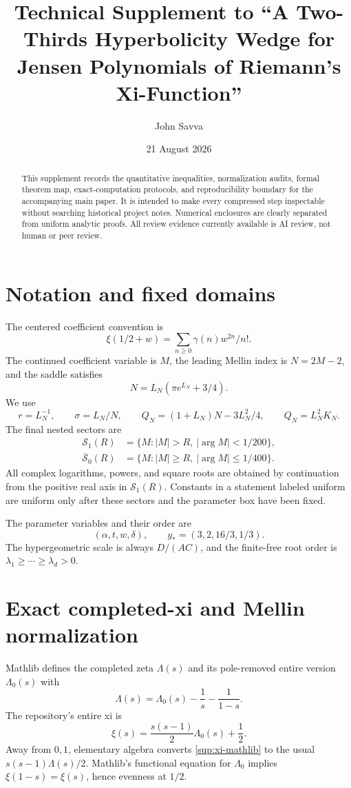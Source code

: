\documentclass[10pt]{article}
\title{Technical Supplement to ``A Two-Thirds Hyperbolicity Wedge for Jensen Polynomials of Riemann's Xi-Function''}
\author{John Savva}
\date{21 August 2026}
\begin{document}
\maketitle

\begin{abstract}
This supplement records the quantitative inequalities, normalization audits,
formal theorem map, exact-computation protocols, and reproducibility boundary
for the accompanying main paper.  It is intended to make every compressed
step inspectable without searching historical project notes.  Numerical
enclosures are clearly separated from uniform analytic proofs.  All review
evidence currently available is AI review, not human or peer review.
\end{abstract}

\tableofcontents

\section{Notation and fixed domains}\label{sup:notation}

The centered coefficient convention is
\[
 \xi(1/2+w)=\sum_{n\ge0}\gamma(n)w^{2n}/n!.
\]
The continued coefficient variable is $M$, the leading Mellin index is
$N=2M-2$, and the saddle satisfies
\[
 N=L_N(\pi e^{L_N}+3/4).
\]
We use
\[
 r=L_N^{-1},\qquad \sigma=L_N/N,\qquad
 Q_N=(1+L_N)N-3L_N^2/4,\qquad Q_N=L_N^2K_N.
\]
The final nested sectors are
\begin{align*}
 \mathcal S_1(R)&=\{M:|M|>R,\ |\arg M|<1/200\},\\
 \overline{\mathcal S}_0(R)&=\{M:|M|\ge R,\ |\arg M|\le1/400\}.
\end{align*}
All complex logarithms, powers, and square roots are obtained by continuation
from the positive real axis in $\mathcal S_1(R)$.  Constants in a statement
labeled uniform are uniform only after these sectors and the parameter box
have been fixed.

The parameter variables and their order are
\[
 (\alpha,t,w,\delta),\qquad
 y_*=(3,2,16/3,1/3).
\]
The hypergeometric scale is always $D/(AC)$, and the finite-free root order is
$\lambda_1\ge\cdots\ge\lambda_d>0$.

\section{Exact completed-xi and Mellin normalization}\label{sup:mellin}

Mathlib defines the completed zeta $\Lambda(s)$ and its pole-removed entire
version $\Lambda_0(s)$ with
\[
 \Lambda(s)=\Lambda_0(s)-\frac1s-\frac1{1-s}.
\]
The repository's entire xi is
\begin{equation}\label{sup:xi-mathlib}
 \xi(s)=\frac{s(s-1)}2\Lambda_0(s)+\frac12.
\end{equation}
Away from $0,1$, elementary algebra converts \eqref{sup:xi-mathlib} to the
usual $s(s-1)\Lambda(s)/2$.  Mathlib's functional equation for $\Lambda_0$
implies $\xi(1-s)=\xi(s)$, hence evenness at $1/2$.
\end{document}
